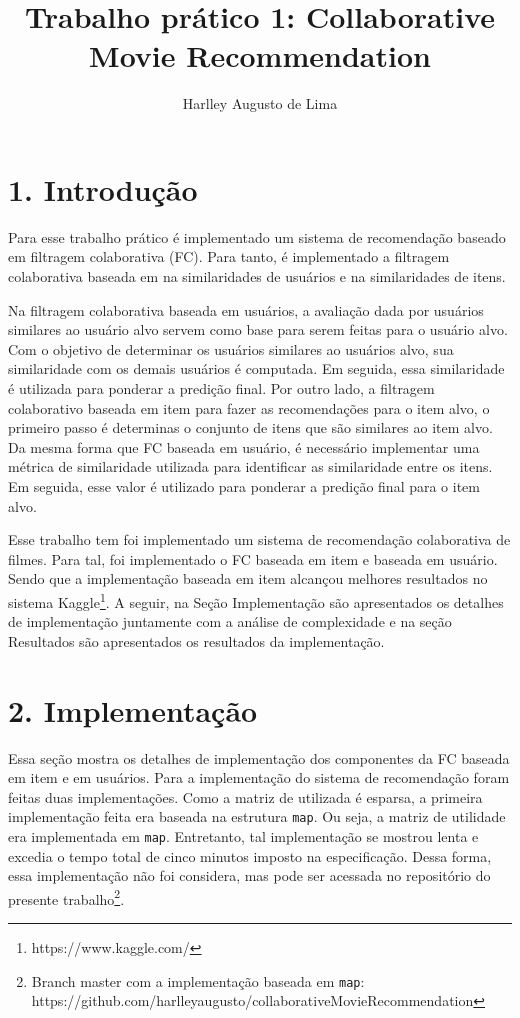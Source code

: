 \documentclass[brazil,a4paper,11pt]{article}
\title{Trabalho prático 1: Collaborative Movie Recommendation}
\author{Harlley Augusto de Lima}
\begin{document}
\maketitle

\section{1. Introdução}

Para esse trabalho prático é implementado um sistema de recomendação baseado em filtragem colaborativa (FC). Para tanto, é implementado a filtragem colaborativa baseada em na similaridades de usuários e na similaridades de itens. 

Na filtragem colaborativa baseada em usuários, a avaliação dada por usuários similares ao usuário alvo servem como base para serem feitas para o usuário alvo. Com o objetivo de determinar os usuários similares ao usuários alvo, sua similaridade com os demais usuários é computada. Em seguida, essa similaridade é utilizada para ponderar a predição final. Por outro lado, a filtragem colaborativo baseada em item para fazer as recomendações para o item alvo, o primeiro passo é determinas o conjunto de itens que são similares ao item alvo. Da mesma forma que FC baseada em usuário, é necessário implementar uma métrica de similaridade utilizada para identificar as similaridade entre os itens. Em seguida, esse valor é utilizado para ponderar a predição final para o item alvo.

Esse trabalho tem foi implementado um sistema de recomendação colaborativa de filmes. Para tal, foi implementado o FC baseada em item e baseada em usuário. Sendo que a implementação baseada em item alcançou melhores resultados no sistema Kaggle\footnote{https://www.kaggle.com/}. A seguir, na Seção Implementação são apresentados os detalhes de implementação juntamente com a análise de complexidade e na seção Resultados são apresentados os resultados da implementação.

\section{2. Implementação}

Essa seção mostra os detalhes de implementação dos componentes da FC baseada em item e em usuários. Para a implementação do sistema de recomendação foram feitas duas implementações. Como a matriz de utilizada é esparsa, a primeira implementação feita era baseada na estrutura \texttt{map}. Ou seja, a matriz de utilidade era implementada em \texttt{map}. Entretanto, tal implementação se mostrou lenta e excedia o tempo total de cinco minutos imposto na especificação. Dessa forma, essa implementação não foi considera, mas pode ser acessada no repositório do presente trabalho\footnote{Branch master com a implementação baseada em \texttt{map}:\\ https://github.com/harlleyaugusto/collaborativeMovieRecommendation}.
\end{document}
